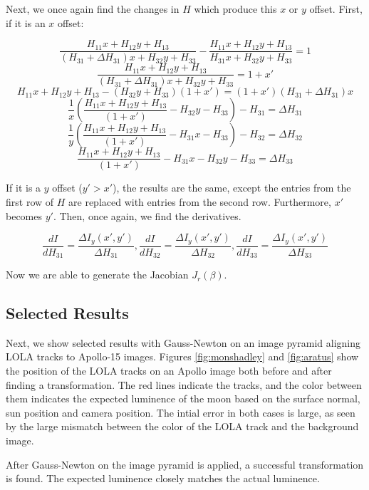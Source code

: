 \documentclass[float=false, crop=false]{standalone}
\begin{document}
Next, we once again find the changes in $H$ which produce this $x$ or $y$ offset. First, if it is an $x$ offset:

$$\frac{H_{11} x + H_{12}y + H_{13}}{(H_{31} + \Delta H_{31})x + H_{32}y + H_{33}} - \frac{H_{11}x + H_{12}y + H_{13}}{H_{31}x + H_{32}y + H_{33}} = 1$$
$$\frac{H_{11} x + H_{12}y + H_{13}}{(H_{31} + \Delta H_{31})x + H_{32}y + H_{33}} = 1 + x'$$
$$H_{11} x + H_{12}y + H_{13} - (H_{32}y + H_{33})(1 + x') = (1 + x')\left(H_{31} + \Delta H_{31}\right)x$$
$$\frac{1}{x}\left(\frac{H_{11} x + H_{12}y + H_{13}}{(1+x')}- H_{32}y - H_{33}\right) - H_{31} = \Delta H_{31}$$
$$\frac{1}{y}\left(\frac{H_{11} x + H_{12}y + H_{13}}{(1+x')}- H_{31}x - H_{33}\right) - H_{32} = \Delta H_{32}$$
$$\frac{H_{11} x + H_{12}y + H_{13}}{(1+x')}- H_{31}x - H_{32}y - H_{33} = \Delta H_{33}$$

If it is a $y$ offset ($y' > x'$), the results are the same, except the entries from the first row of $H$ are replaced with
entries from the second row. Furthermore, $x'$ becomes $y'$. Then, once again, we find the derivatives.

$$\frac{dI}{dH_{31}} = \frac{\Delta I_y(x', y')}{\Delta H_{31}}, 
\frac{dI}{dH_{32}} = \frac{\Delta I_y(x', y')}{\Delta H_{32}}, 
\frac{dI}{dH_{33}} = \frac{\Delta I_y(x', y')}{\Delta H_{33}}$$

Now we are able to generate the Jacobian $J_r(\beta)$.



\subsection{Selected Results}
Next, we show selected results with Gauss-Newton on an image pyramid aligning
LOLA tracks to Apollo-15 images. Figures \ref{fig:monshadley} and \ref{fig:aratus}
show the position of the LOLA tracks on an Apollo image both before and after
finding a transformation. The red lines indicate the tracks, and the color
between them indicates the expected luminence of the moon based on the surface
normal, sun position and camera position. The intial error in both cases is large,
as seen by the large mismatch between the color of the LOLA track and the
background image.

After Gauss-Newton on the image pyramid is applied, a successful transformation is found.
The expected luminence closely matches the actual luminence.
\end{document}
